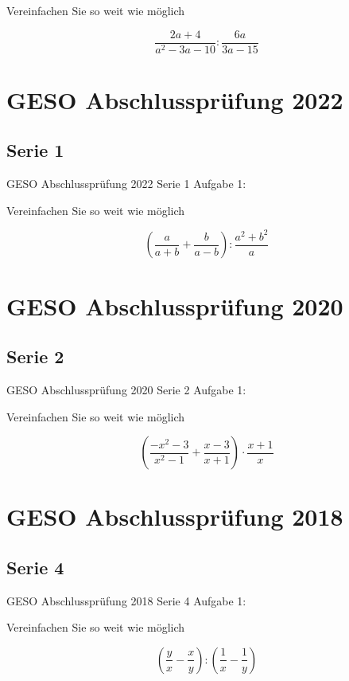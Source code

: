 Vereinfachen Sie so weit wie möglich

$$\frac{2a+4}{a^2-3a-10} : \frac{6a}{3a-15}$$


\section*{GESO Abschlussprüfung 2022}
\subsection*{Serie 1}
GESO Abschlussprüfung 2022 Serie 1 Aufgabe 1:

Vereinfachen Sie so weit wie möglich

$$\left( \frac{a}{a+b} + \frac{b}{a-b} \right) : \frac{a^2+b^2}a$$




\section*{GESO Abschlussprüfung 2020}
\subsection*{Serie 2}
GESO Abschlussprüfung 2020 Serie 2 Aufgabe 1:

Vereinfachen Sie so weit wie möglich

$$\left( \frac{-x^2-3}{x^2-1} + \frac{x-3}{x+1} \right) \cdot{}  \frac{x+1}{x}$$




\section*{GESO Abschlussprüfung 2018}
\subsection*{Serie 4}
GESO Abschlussprüfung 2018 Serie 4 Aufgabe 1:

Vereinfachen Sie so weit wie möglich

$$\left( \frac{y}{x} - \frac{x}{y} \right) : \left( \frac1{x}  - \frac1{y}  \right)$$




